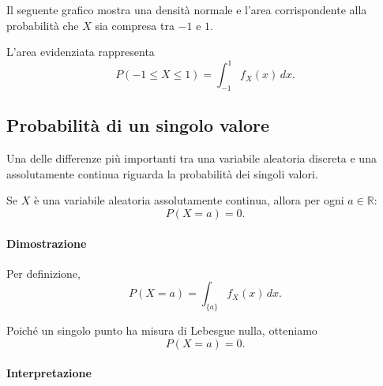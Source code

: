 Il seguente grafico mostra una densità normale
e l'area corrispondente alla probabilità
che $X$ sia compresa tra $-1$ e $1$.

\begin{center}
\end{center}

L'area evidenziata rappresenta
\[
P(-1\leq X\leq 1)
=
\int_{-1}^{1}f_X(x)\,dx.
\]

\subsection{Probabilità di un singolo valore}

Una delle differenze più importanti
tra una variabile aleatoria discreta
e una assolutamente continua
riguarda la probabilità dei singoli valori.

\begin{theorem}
Se $X$ è una variabile aleatoria
assolutamente continua, allora
per ogni $a\in\mathbb{R}$:
\[
\boxed{P(X=a)=0.}
\]
\end{theorem}

\paragraph{Dimostrazione}

Per definizione,
\[
P(X=a)
=
\int_{\{a\}} f_X(x)\,dx.
\]

Poiché un singolo punto ha misura
di Lebesgue nulla, otteniamo
\[
P(X=a)=0.
\]

\paragraph{Interpretazione}

